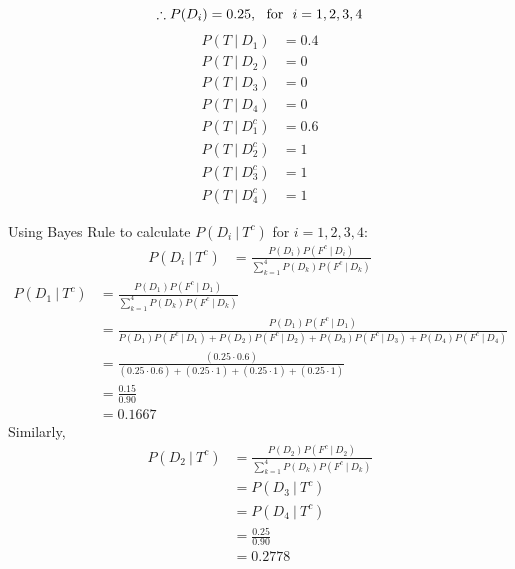 \documentclass[paper=usletter, fontsize=12pt]{article}
\newcommand\given[1][]{\:#1\vert\:}
\begin{document}
\begin{enumerate}
            \begin{equation*}
                \therefore P(D_i) = 0.25, \text{ \ for \ } i = 1, 2, 3, 4 \\
            \end{equation*}
            \begin{align*}
                P(T \given D_1) & = 0.4 \\
                P(T \given D_2) & = 0 \\
                P(T \given D_3) & = 0 \\
                P(T \given D_4) & = 0
            \end{align*}
            \begin{align*}
                P(T \given D_1^c) & = 0.6 \\
                P(T \given D_2^c) & = 1 \\
                P(T \given D_3^c) & = 1 \\
                P(T \given D_4^c) & = 1
            \end{align*}

        Using Bayes Rule to calculate $P(D_i \given T^c)$ for $i = 1, 2, 3, 4$:
            \begin{align*}
                P(D_i \given T^c) & = \frac{P(D_i)P(F^c \given
                D_i)}{\sum_{k=1}^{4}P(D_k)P(F^c \given D_k)}
            \end{align*}
            \begin{align*}
                P(D_1 \given T^c) & = \frac{P(D_1)P(F^c \given
                D_1)}{\sum_{k=1}^{4}P(D_k)P(F^c \given D_k)} \\
                & = \frac{P(D_1)P(F^c \given D_1)}{P(D_1)P(F^c \given D_1) +
                P(D_2)P(F^c \given D_2) + P(D_3)P(F^c \given D_3) + P(D_4)P(F^c
                \given D_4)} \\
                & = \frac{(0.25 \cdot 0.6)}{(0.25 \cdot 0.6) + (0.25
                \cdot 1) + (0.25 \cdot 1) + (0.25 \cdot 1)} \\
                & = \frac{0.15}{0.90} \\
                & = 0.1667
            \end{align*}
        Similarly,
            \begin{align*}
                P(D_2 \given T^c) & = \frac{P(D_2)P(F^c \given
                D_2)}{\sum_{k=1}^{4}P(D_k)P(F^c \given D_k)} \\
                & = P(D_3 \given T^c) \\
                & = P(D_4 \given T^c) \\
                & = \frac{0.25}{0.90} \\
                & = 0.2778
            \end{align*}


\end{enumerate}
\end{document}
